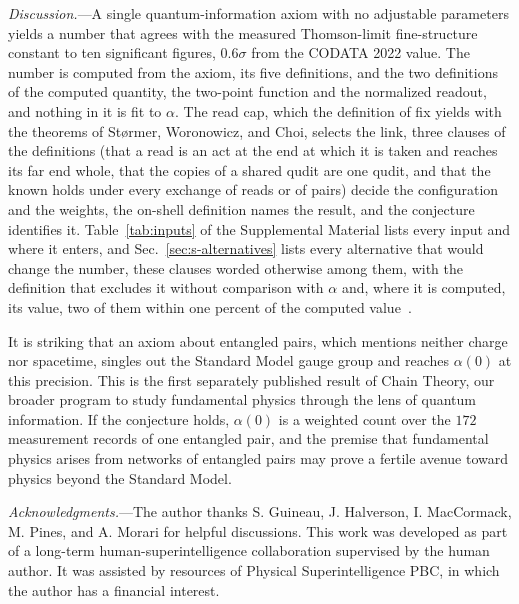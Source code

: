 \documentclass[aps,prl,reprint,superscriptaddress,longbibliography,nofootinbib,floatfix]{revtex4-2}
\theoremstyle{definition}
\begin{document}
\emph{Discussion.}---A single quantum-information axiom with no adjustable parameters yields a number that agrees with the measured Thomson-limit fine-structure constant to ten significant figures, $0.6\sigma$ from the CODATA 2022 value. The number is computed from the axiom, its five definitions, and the two definitions of the computed quantity, the two-point function and the normalized readout, and nothing in it is fit to $\alpha$. The read cap, which the definition of fix yields with the theorems of St{\o}rmer, Woronowicz, and Choi, selects the link, three clauses of the definitions (that a read is an act at the end at which it is taken and reaches its far end whole, that the copies of a shared qudit are one qudit, and that the known holds under every exchange of reads or of pairs) decide the configuration and the weights, the on-shell definition names the result, and the conjecture identifies it. Table~\ref{tab:inputs} of the Supplemental Material lists every input and where it enters, and Sec.~\ref{sec:s-alternatives} lists every alternative that would change the number, these clauses worded otherwise among them, with the definition that excludes it without comparison with $\alpha$ and, where it is computed, its value, two of them within one percent of the computed value~\cite{SM}.

It is striking that an axiom about entangled pairs, which mentions neither charge nor spacetime, singles out the Standard Model gauge group and reaches $\alpha(0)$ at this precision. This is the first separately published result of Chain Theory, our broader program to study fundamental physics through the lens of quantum information. If the conjecture holds, $\alpha(0)$ is a weighted count over the $172$ measurement records of one entangled pair, and the premise that fundamental physics arises from networks of entangled pairs may prove a fertile avenue toward physics beyond the Standard Model.

\begin{acknowledgments}
\emph{Acknowledgments.}---The author thanks S. Guineau, J. Halverson, I. MacCormack, M. Pines, and A. Morari for helpful discussions. This work was developed as part of a long-term human-superintelligence collaboration supervised by the human author. It was assisted by resources of Physical Superintelligence PBC, in which the author has a financial interest.
\end{acknowledgments}
\end{document}
